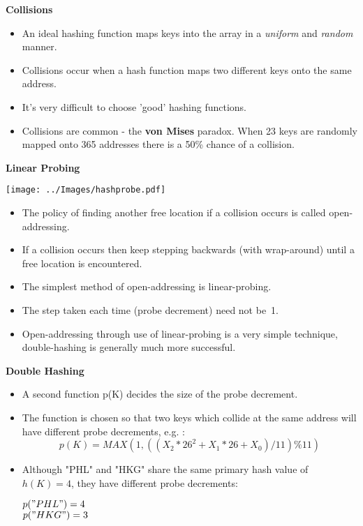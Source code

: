 \newpage
{\samepage
\begin{center}
{\Large{\bf Collisions}}
\end{center}
\begin{itemize}
\item An ideal hashing function maps keys into the array in a {\it uniform} and {\it random} manner.
\item Collisions occur when a hash function maps two different keys onto the same address.
\item It's very difficult to choose 'good' hashing functions.
\item Collisions are common - the {\bf von Mises} paradox. When 23 keys are randomly mapped onto 365 addresses there is a 50\% chance of a collision.
\end{itemize}
}

\newpage
{\samepage
\begin{center}
{\Large{\bf Linear Probing}}
\end{center}
{\small
\begin{center}
\texttt{[image: ../Images/hashprobe.pdf]}
\begin{itemize}
\item The policy of finding another free location if a collision occurs is called open-addressing.
\item If a collision occurs then keep stepping backwards (with wrap-around) until a free location is encountered.
\item The simplest method of open-addressing is linear-probing.
\item The step taken each time (probe decrement) need not be~1.
\item Open-addressing through use of linear-probing is a very simple technique, double-hashing is generally much more successful.
\end{itemize}
\end{center}
}}

\newpage
{\samepage
\begin{center}
{\Large{\bf Double Hashing}}
\end{center}
\begin{itemize}
\item A second function p(K) decides the size of the probe decrement.
\item The function is chosen so that two keys which collide at the same address will have different probe decrements, e.g. :
{\small
\[
p(K) = MAX (1, ((X_2*26^2 + X_1*26+X_0)/11)\%11)
\]
}
\item Although "PHL" and "HKG" share the same primary hash value of $h(K)=4$, they
have different probe decrements:

$p("PHL")=4$\\

$p("HKG")=3$
\end{itemize}
}

